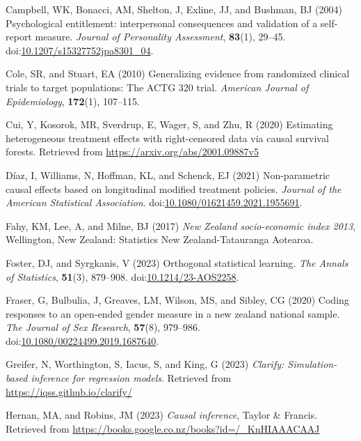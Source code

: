\documentclass[
  singlecolumn]{article}
\newlength{\cslhangindent}
\newenvironment{CSLReferences}[2] %
 {\begin{list}{}{%
  \setlength{\itemindent}{0pt}
  \setlength{\leftmargin}{0pt}
  \setlength{\parsep}{0pt}
  \ifodd #1
   \setlength{\leftmargin}{\cslhangindent}
   \setlength{\itemindent}{-1\cslhangindent}
  \fi
  \setlength{\itemsep}{#2\baselineskip}}}
 {\end{list}}
\begin{document}
\begin{CSLReferences}{1}{0}
Campbell, WK, Bonacci, AM, Shelton, J, Exline, JJ, and Bushman, BJ
(2004) Psychological entitlement: interpersonal consequences and
validation of a self-report measure. \emph{Journal of Personality
Assessment}, \textbf{83}(1), 29--45.
doi:\href{https://doi.org/10.1207/s15327752jpa8301_04}{10.1207/s15327752jpa8301\_04}.

Cole, SR, and Stuart, EA (2010) Generalizing evidence from randomized
clinical trials to target populations: The ACTG 320 trial.
\emph{American Journal of Epidemiology}, \textbf{172}(1), 107--115.

Cui, Y, Kosorok, MR, Sverdrup, E, Wager, S, and Zhu, R (2020) Estimating
heterogeneous treatment effects with right-censored data via causal
survival forests. Retrieved from
\url{https://arxiv.org/abs/2001.09887v5}

Díaz, I, Williams, N, Hoffman, KL, and Schenck, EJ (2021) Non-parametric
causal effects based on longitudinal modified treatment policies.
\emph{Journal of the American Statistical Association}.
doi:\href{https://doi.org/10.1080/01621459.2021.1955691}{10.1080/01621459.2021.1955691}.

Fahy, KM, Lee, A, and Milne, BJ (2017) \emph{New Zealand socio-economic
index 2013}, Wellington, New Zealand: Statistics New Zealand-Tatauranga
Aotearoa.

Foster, DJ, and Syrgkanis, V (2023) Orthogonal statistical learning.
\emph{The Annals of Statistics}, \textbf{51}(3), 879--908.
doi:\href{https://doi.org/10.1214/23-AOS2258}{10.1214/23-AOS2258}.

Fraser, G, Bulbulia, J, Greaves, LM, Wilson, MS, and Sibley, CG (2020)
Coding responses to an open-ended gender measure in a new zealand
national sample. \emph{The Journal of Sex Research}, \textbf{57}(8),
979--986.
doi:\href{https://doi.org/10.1080/00224499.2019.1687640}{10.1080/00224499.2019.1687640}.

Greifer, N, Worthington, S, Iacus, S, and King, G (2023) \emph{Clarify:
Simulation-based inference for regression models}. Retrieved from
\url{https://iqss.github.io/clarify/}

Hernan, MA, and Robins, JM (2023) \emph{Causal inference}, Taylor \&
Francis. Retrieved from
\url{https://books.google.co.nz/books?id=/_KnHIAAACAAJ}


\end{CSLReferences}
\end{document}
